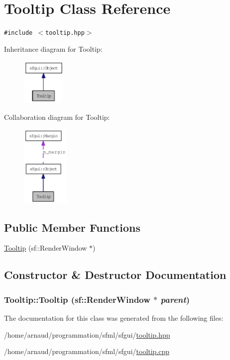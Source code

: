 \hypertarget{classTooltip}{
\section{Tooltip Class Reference}
\label{classTooltip}
}
{\tt \#include $<$tooltip.hpp$>$}

Inheritance diagram for Tooltip:\nopagebreak
\begin{figure}[H]
\begin{center}
\leavevmode
\includegraphics[width=59pt]{classTooltip__inherit__graph}
\end{center}
\end{figure}
Collaboration diagram for Tooltip:\nopagebreak
\begin{figure}[H]
\begin{center}
\leavevmode
\includegraphics[width=65pt]{classTooltip__coll__graph}
\end{center}
\end{figure}
\subsection*{Public Member Functions}
\begin{CompactItemize}
\item 
\hyperlink{classTooltip_803db4e9338a55e27ac8d186c2cc99df}{Tooltip} (sf::RenderWindow $\ast$)
\end{CompactItemize}


\subsection{Constructor \& Destructor Documentation}
\hypertarget{classTooltip_803db4e9338a55e27ac8d186c2cc99df}{
\subsubsection[Tooltip]{\setlength{\rightskip}{0pt plus 5cm}Tooltip::Tooltip (sf::RenderWindow $\ast$ {\em parent})}}
\label{classTooltip_803db4e9338a55e27ac8d186c2cc99df}




The documentation for this class was generated from the following files:\begin{CompactItemize}
\item 
/home/arnaud/programmation/sfml/sfgui/\hyperlink{tooltip_8hpp}{tooltip.hpp}\item 
/home/arnaud/programmation/sfml/sfgui/\hyperlink{tooltip_8cpp}{tooltip.cpp}\end{CompactItemize}
